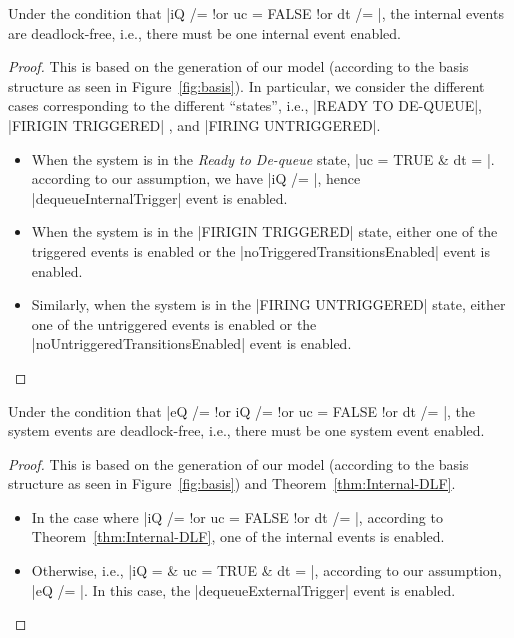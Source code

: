 \begin{theorem}
  \label{thm:Internal-DLF}
  Under the condition that %
  |iQ /= {} !or uc = FALSE !or dt /= {}|, %
  the internal events are deadlock-free, i.e., there must be
  one internal event enabled.
\end{theorem}
\begin{proof}
  This is based on the generation of our \EventB model (according to
  the basis structure as seen in Figure~\ref{fig:basis}).  In
  particular, we consider the different cases corresponding to the
  different ``states'', i.e., |READY TO DE-QUEUE|, |FIRIGIN TRIGGERED|
  , and |FIRING UNTRIGGERED|.
  \begin{itemize}
  \item When the system is in the \emph{Ready to De-queue} state, %
    |uc = TRUE & dt = {}|.  %
    according to our assumption, we have |iQ /= {}|, hence
    |dequeueInternalTrigger| event is enabled.
    
  \item When the system is in the |FIRIGIN TRIGGERED| state,
    either one of the triggered events is enabled or the
    |noTriggeredTransitionsEnabled| event is enabled.
    
  \item Similarly, when the system is in the |FIRING UNTRIGGERED|
      state, either one of the untriggered events is enabled or the
      |noUntriggeredTransitionsEnabled| event is enabled.  
  \end{itemize}
\end{proof}
    
\begin{corollary}
  Under the condition that %
  |eQ /= {} !or iQ /= {} !or uc = FALSE !or dt /= {}|, %
  the system events are deadlock-free, i.e., there must be
  one system event enabled.
\end{corollary}
\begin{proof}
  This is based on the generation of our \EventB model (according to
  the basis structure as seen in Figure~\ref{fig:basis}) and
  Theorem~\ref{thm:Internal-DLF}.
  \begin{itemize}
  \item In the case where |iQ /= {} !or uc = FALSE !or dt /= {}|,
    according to Theorem~\ref{thm:Internal-DLF}, one of the internal
    events is enabled.
    
  \item Otherwise, i.e., |iQ = {} & uc = TRUE & dt = {}|, according to
    our assumption, |eQ /= {}|. In this case, the
    |dequeueExternalTrigger| event is enabled.
\end{itemize}
\end{proof}

